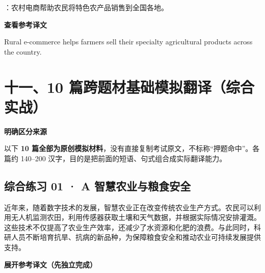 \documentclass[a4paper,11pt,UTF8,fontset=none]{ctexart}
\begin{document}
\vspace{4pt}

：农村电商帮助农民将特色农产品销售到全国各地。\par

\noindent\colorbox{HeadBlue}{\strut {\bfseries 查看参考译文}}\par\vspace{1pt}

\noindent Rural e-commerce helps farmers sell their specialty agricultural products across the country.\par

\vspace{4pt}

\section{十一、10 篇跨题材基础模拟翻译（综合实战）}

\begin{tcolorbox}[enhanced,breakable,boxrule=0.35pt,colback=VeryPaleRose,colframe=WarmRed!40,left=7pt,right=7pt,top=4pt,bottom=4pt,borderline west={2pt}{0pt}{WarmRed},before skip=4pt,after skip=6pt]
{\bfseries\color{WarmRed} 明确区分来源}\par\vspace{1pt}
\noindent 以下 {\bfseries 10 篇全部为原创模拟材料}，没有直接复制考试原文，不标称“押题命中”。各篇约 140–200 汉字，目的是把前面的短语、句式组合成实际翻译能力。\par


\end{tcolorbox}

\subsection{综合练习 01 · A 智慧农业与粮食安全}

\par

\noindent 近年来，随着数字技术的发展，智慧农业正在改变传统农业生产方式。农民可以利用无人机监测农田，利用传感器获取土壤和天气数据，并根据实际情况安排灌溉。这些技术不仅提高了农业生产效率，还减少了水资源和化肥的浪费。与此同时，科研人员不断培育抗旱、抗病的新品种，为保障粮食安全和推动农业可持续发展提供支持。\par

\noindent\colorbox{HeadBlue}{\strut {\bfseries 展开参考译文（先独立完成）}}\par\vspace{1pt}
\end{document}
